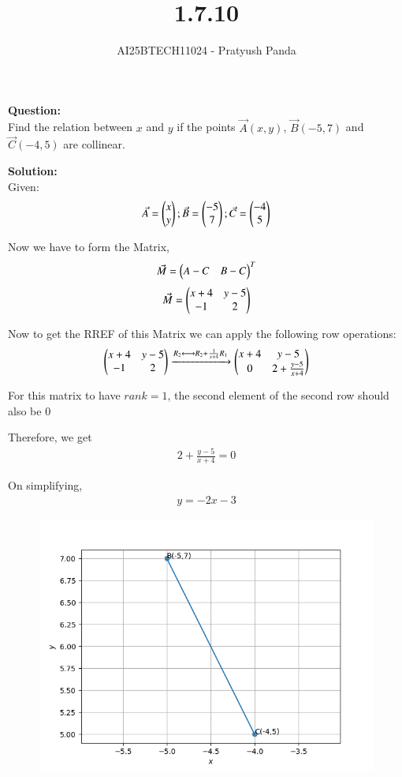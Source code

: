 \documentclass[journal]{IEEEtran}
\begin{document}

\vspace{3cm}

\title{1.7.10}
\author{AI25BTECH11024 - Pratyush Panda
}
\maketitle
{\let\newpage\relax\maketitle}

\renewcommand{\thefigure}{\theenumi}
\renewcommand{\thetable}{\theenumi}
\setlength{\intextsep}{10pt} %


\renewcommand{\thetable}{\theenumi}

\textbf{Question: }\\
Find the relation between $x$ and $y$ if the points $\Vec{A}(x, y)$, $\Vec{B}(-5, 7)$ and $\Vec{C}(-4, 5)$ are collinear.

\textbf{Solution: } \\
Given:
$$
\Vec{A}=\begin{pmatrix}x \\ y\end{pmatrix} ; \Vec{B}=\begin{pmatrix}-5 \\ 7\end{pmatrix} ; \Vec{C}=\begin{pmatrix}-4 \\ 5\end{pmatrix}
$$

Now we have to form the Matrix,\\
\begin{align}
\Vec{M}=\begin{pmatrix}A-C & B-C\end{pmatrix}^T
\end{align}
\begin{align}
\Vec{M}=\begin{pmatrix}x+4 & y-5 \\ -1 & 2\end{pmatrix}
\end{align}

Now to get the RREF of this Matrix we can apply the following row operations:
\begin{align}
\begin{pmatrix}x+4 & y-5 \\ -1 & 2\end{pmatrix} \xrightarrow{R_2 \longleftrightarrow R_2 + \frac{1}{x+4}R_1} \begin{pmatrix}x+4 & y-5 \\ 0 & 2 + \frac{y-5}{x+4}\end{pmatrix}
\end{align}

For this matrix to have $rank=1$, the second element of the second row should also be $0$

Therefore, we get
\begin{align}
2 + \frac{y-5}{x+4} = 0
\end{align}

On simplifying,
\begin{align}
y = -2x -3
\end{align}

\begin{figure}[H]
\centering
\includegraphics[width=0.6\columnwidth]{figs/img.png}
\caption*{}
\end{figure}
\end{document}
